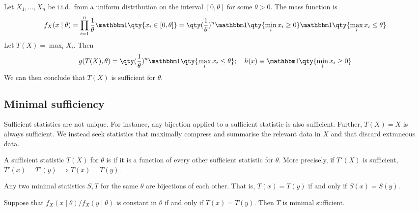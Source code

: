 \begin{example}
	Let $X_1, \dots, X_n$ be i.i.d.\ from a uniform distribution on the interval $[0,\theta]$ for some $\theta > 0$.
	The mass function is
	\begin{align*}
		f_X(x \mid \theta) = \prod_{i=1}^n \frac{1}{\theta} \mathbbm 1\qty{x_i \in [0,\theta]} = \qty(\frac{1}{\theta})^{n} \mathbbm 1\qty{\min_i x_i \geq 0} \mathbbm 1\qty{\max_i x_i \leq \theta}
	\end{align*}
	Let $T(X) = \max_i X_i$.
	Then
	\begin{align*}
		g(T(X), \theta) = \qty(\frac{1}{\theta})^n \mathbbm 1\qty{\max_i x_i \leq \theta};\quad h(x) \equiv \mathbbm 1\qty{\min_i x_i \geq 0}
	\end{align*}
	We can then conclude that $T(X)$ is sufficient for $\theta$.
\end{example}

\subsection{Minimal sufficiency}
Sufficient statistics are not unique.
For instance, any bijection applied to a sufficient statistic is also sufficient.
Further, $T(X) = X$ is always sufficient.
We instead seek statistics that maximally compress and summarise the relevant data in $X$ and that discard extraneous data.

\begin{definition}
	A sufficient statistic $T(X)$ for $\theta$ is  if it is a function of every other sufficient statistic for $\theta$.
	More precisely, if $T'(X)$ is sufficient, $T'(x) = T'(y) \implies T(x) = T(y)$.
\end{definition}

\begin{remark}
	Any two minimal statistics $S, T$ for the same $\theta$ are bijections of each other.
	That is, $T(x) = T(y)$ if and only if $S(x) = S(y)$.
\end{remark}

\begin{theorem}
	Suppose that $f_X(x \mid \theta)/f_X(y \mid \theta)$ is constant in $\theta$ if and only if $T(x) = T(y)$.
	Then $T$ is minimal sufficient.
\end{theorem}

